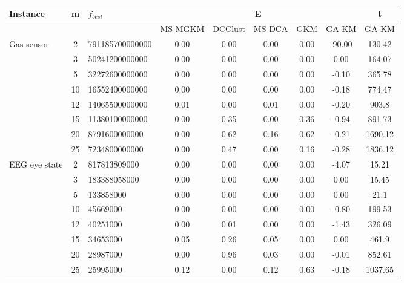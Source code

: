 {\scriptsize
\centering
\begin{longtable}{@{}lclcccccc@{}}
\toprule
Instance          & m  & $f_{best}$       & \multicolumn{5}{c}{E}                       & t         \\ \midrule
                  &    &                  & MS-MGKM & DCClust & MS-DCA & GKM  & GA-KM   & GA-KM     \\
Gas sensor        & 2  & 791185700000000  & 0.00    & 0.00    & 0.00   & 0.00 & -90.00  & 130.42    \\
                  & 3  & 50241200000000   & 0.00    & 0.00    & 0.00   & 0.00 & 0.00    & 164.07    \\
                  & 5  & 32272600000000   & 0.00    & 0.00    & 0.00   & 0.00 & -0.10   & 365.78    \\
                  & 10 & 16552400000000   & 0.00    & 0.00    & 0.00   & 0.00 & -0.18   & 774.47    \\
                  & 12 & 14065500000000   & 0.01    & 0.00    & 0.01   & 0.00 & -0.20   & 903.8     \\
                  & 15 & 11380100000000   & 0.00    & 0.35    & 0.00   & 0.36 & -0.94   & 891.73    \\
                  & 20 & 8791600000000    & 0.00    & 0.62    & 0.16   & 0.62 & -0.21   & 1690.12   \\
                  & 25 & 7234800000000    & 0.00    & 0.47    & 0.00   & 0.16 & -0.28   & 1836.12   \\ \hline
EEG eye state     & 2  & 817813809000     & 0.00    & 0.00    & 0.00   & 0.00 & -4.07   & 15.21     \\
                  & 3  & 183388058000     & 0.00    & 0.00    & 0.00   & 0.00 & 0.00    & 15.45     \\
                  & 5  & 133858000        & 0.00    & 0.00    & 0.00   & 0.00 & 0.00    & 21.1      \\
                  & 10 & 45669000         & 0.00    & 0.00    & 0.00   & 0.00 & -0.80   & 199.53    \\
                  & 12 & 40251000         & 0.00    & 0.01    & 0.00   & 0.00 & -1.43   & 326.09    \\
                  & 15 & 34653000         & 0.05    & 0.26    & 0.05   & 0.00 & 0.00    & 461.9     \\
                  & 20 & 28987000         & 0.00    & 0.96    & 0.03   & 0.00 & -0.01   & 852.61    \\
                  & 25 & 25995000         & 0.12    & 0.00    & 0.12   & 0.63 & -0.18   & 1037.65   \\ \hline

\end{longtable}}
